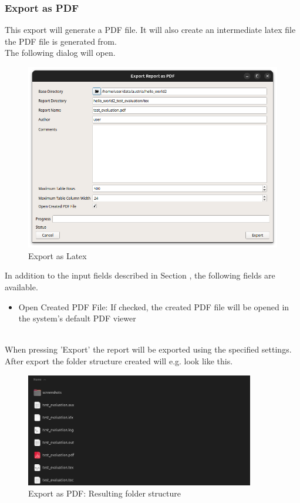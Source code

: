 \subsubsection{Export as PDF}
\label{sec:report_export_pdf}

This export will generate a PDF file. It will also create an intermediate latex file the PDF file is generated from. \\

The following dialog will open.

\begin{figure}[H]
    \hspace*{-2.5cm}
    \center
    \includegraphics[width=12cm,frame]{figures/export_pdf.png}
  \caption{Export as Latex}
\end{figure}

In addition to the input fields described in Section , 
the following fields are available.

\begin{itemize}  
    \item Open Created PDF File: If checked, the created PDF file will be opened in the system's default PDF viewer
\end{itemize}
\ \\

When pressing 'Export' the report will be exported using the specified settings.
After export the folder structure created will e.g. look like this.

\begin{figure}[H]
    \hspace*{-2.5cm}
    \center
    \includegraphics[width=10cm,frame]{figures/export_pdf_result.png}
  \caption{Export as PDF: Resulting folder structure}
\end{figure}

